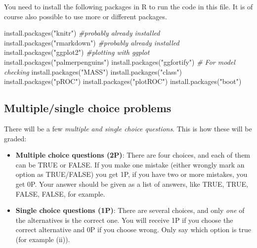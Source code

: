 \documentclass[
]{article}
\newenvironment{Shaded}{\begin{snugshade}}{\end{snugshade}}
\newcommand{\CommentTok}[1]{\textcolor[rgb]{0.56,0.35,0.01}{\textit{#1}}}
\newcommand{\FunctionTok}[1]{\textcolor[rgb]{0.00,0.00,0.00}{#1}}
\newcommand{\NormalTok}[1]{#1}
\newcommand{\StringTok}[1]{\textcolor[rgb]{0.31,0.60,0.02}{#1}}
\begin{document}
You need to install the following packages in R to run the code in this
file. It is of course also possible to use more or different packages.

\begin{Shaded}
\begin{Highlighting}[]
\FunctionTok{install.packages}\NormalTok{(}\StringTok{"knitr"}\NormalTok{) }\CommentTok{\#probably already installed}
\FunctionTok{install.packages}\NormalTok{(}\StringTok{"rmarkdown"}\NormalTok{) }\CommentTok{\#probably already installed}
\FunctionTok{install.packages}\NormalTok{(}\StringTok{"ggplot2"}\NormalTok{) }\CommentTok{\#plotting with ggplot}
\FunctionTok{install.packages}\NormalTok{(}\StringTok{"palmerpenguins"}\NormalTok{)}
\FunctionTok{install.packages}\NormalTok{(}\StringTok{"ggfortify"}\NormalTok{) }\CommentTok{\# For model checking}
\FunctionTok{install.packages}\NormalTok{(}\StringTok{"MASS"}\NormalTok{)}
\FunctionTok{install.packages}\NormalTok{(}\StringTok{"class"}\NormalTok{)}
\FunctionTok{install.packages}\NormalTok{(}\StringTok{"pROC"}\NormalTok{)}
\FunctionTok{install.packages}\NormalTok{(}\StringTok{"plotROC"}\NormalTok{)}
\FunctionTok{install.packages}\NormalTok{(}\StringTok{"boot"}\NormalTok{)}
\end{Highlighting}
\end{Shaded}

\hypertarget{multiplesingle-choice-problems}{%
\subsection{Multiple/single choice
problems}\label{multiplesingle-choice-problems}}

There will be a few \emph{multiple and single choice questions}. This is
how these will be graded:

\begin{itemize}
\item
  \textbf{Multiple choice questions (2P)}: There are four choices, and
  each of them can be TRUE or FALSE. If you make one mistake (either
  wrongly mark an option as TRUE/FALSE) you get 1P, if you have two or
  more mistakes, you get 0P. Your answer should be given as a list of
  answers, like TRUE, TRUE, FALSE, FALSE, for example.
\item
  \textbf{Single choice questions (1P)}: There are several choices, and
  only \emph{one} of the alternatives is the correct one. You will
  receive 1P if you choose the correct alternative and 0P if you choose
  wrong. Only say which option is true (for example (ii)).
\end{itemize}
\end{document}
